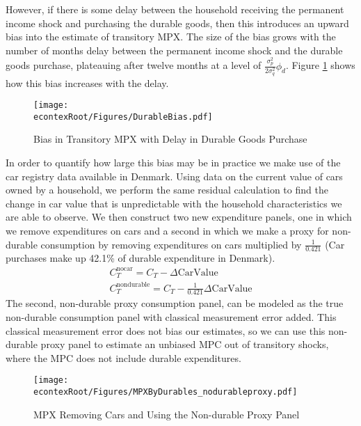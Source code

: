 \documentclass[titlepage]{\econtex}\newcommand{\texname}{ConsumptionHeterogeneity}
\begin{document}
However, if there is some delay between the household receiving the permanent income shock and purchasing the durable goods, then this introduces an upward bias into the estimate of transitory MPX. The size of the bias grows with the number of months delay between the permanent income shock and the durable goods purchase, plateauing after twelve months at a level of $\frac{\sigma^2_p}{2\sigma^2_q}\phi_d$. Figure \ref{fig:durable_bias} shows how this bias increases with the delay.
\begin{figure} 
	\begin{centering}
		\texttt{[image: \\econtexRoot/Figures/DurableBias.pdf]}
		\caption{Bias in Transitory MPX with Delay in Durable Goods Purchase}
		\label{fig:durable_bias}
	\end{centering}
\end{figure}

In order to quantify how large this bias may be in practice we make use of the car registry data available in Denmark. Using data on the current value of cars owned by a household, we perform the same residual calculation to find the change in car value that is unpredictable with the household characteristics we are able to observe. We then construct two new expenditure panels, one in which we remove expenditures on cars and a second in which we make a proxy for non-durable consumption by removing expenditures on cars multiplied by $\frac{1}{0.421}$ (Car purchases make up 42.1\% of durable expenditure in Denmark).
\begin{align*}
C_T^{\text{nocar}} = C_T - \Delta \text{CarValue} \\
C_T^{\text{nondurable}} = C_T - \frac{1}{0.421}\Delta \text{CarValue}
\end{align*}
The second, non-durable proxy consumption panel, can be modeled as the true non-durable consumption panel with classical measurement error added. This classical measurement error does not bias our estimates, so we can use this non-durable proxy panel to estimate an unbiased MPC out of transitory shocks, where the MPC does not include durable expenditures.
\begin{figure} 
	\begin{centering}
		\texttt{[image: \\econtexRoot/Figures/MPXByDurables\_nodurableproxy.pdf]}
		\caption{MPX Removing Cars and Using the Non-durable Proxy Panel}
		\label{fig:MPXByDurables}
	\end{centering}
\end{figure}
\end{document}
